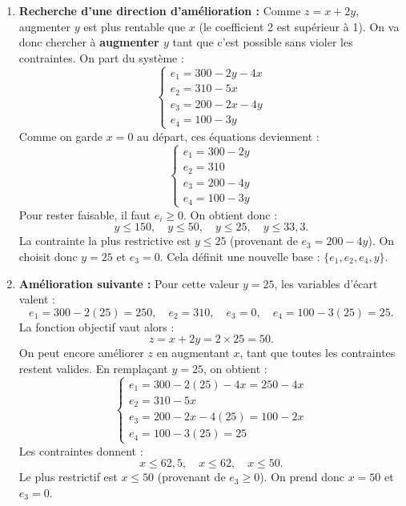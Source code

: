 \begin{example}
\begin{enumerate}
        \item \textbf{Recherche d’une direction d’amélioration : } Comme \(z = x + 2y\), augmenter \(y\) 
        est plus rentable que \(x\) (le coefficient 2 est supérieur à 1).  
        On va donc chercher à \textbf{augmenter \(y\)} tant que c’est possible sans violer les contraintes.
        On part du système :
            \[
                \begin{cases}
                    e_1 = 300 - 2y - 4x \\
                    e_2 = 310 - 5x \\
                    e_3 = 200 - 2x - 4y \\
                    e_4 = 100 - 3y
                \end{cases}
            \]
        Comme on garde \(x=0\) au départ, ces équations deviennent :
            \[
                \begin{cases}
                    e_1 = 300 - 2y \\
                    e_2 = 310 \\
                    e_3 = 200 - 4y \\
                    e_4 = 100 - 3y
                \end{cases}
            \]
        Pour rester faisable, il faut \(e_i \geq 0\).  
        On obtient donc :
            \[
                y \leq 150, \quad y \leq 50, \quad y \leq 25, \quad y \leq 33{,}3.
            \]
        La contrainte la plus restrictive est \(y \leq 25\) (provenant de \(e_3 = 200 - 4y\)).  
        On choisit donc \(y = 25\) et \(e_3 = 0\).  
        Cela définit une nouvelle base : \(\{e_1, e_2, e_4, y\}\).
        
        \item \textbf{Amélioration suivante : } Pour cette valeur \(y = 25\), les variables d’écart valent :
            \[
                e_1 = 300 - 2(25) = 250, \quad
                e_2 = 310, \quad
                e_3 = 0, \quad
                e_4 = 100 - 3(25) = 25.
            \]
        La fonction objectif vaut alors :
            \[
                z = x + 2y = 2 \times 25 = 50.
            \]
        On peut encore améliorer \(z\) en augmentant \(x\), tant que toutes les contraintes restent valides.
        En remplaçant \(y = 25\), on obtient :
            \[
                \begin{cases}
                    e_1 = 300 - 2(25) - 4x = 250 - 4x \\
                    e_2 = 310 - 5x \\
                    e_3 = 200 - 2x - 4(25) = 100 - 2x \\
                    e_4 = 100 - 3(25) = 25
                \end{cases}
            \]
        Les contraintes donnent :
            \[
                x \leq 62{,}5, \quad x \leq 62, \quad x \leq 50.
            \]
        Le plus restrictif est \(x \leq 50\) (provenant de \(e_3 \geq 0\)).  
        On prend donc \(x = 50\) et \(e_3 = 0\).


\end{enumerate}
\end{example}
